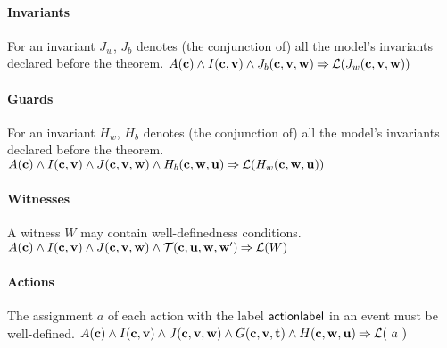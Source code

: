 \paragraph{Invariants}
\label{well_definedness_of_invariants}
For an invariant $J_w$, $J_b$ denotes (the conjunction of) all the model's 
  invariants declared before the theorem.
%
  {$A(\mathbf{c}) \land I(\mathbf{c},\mathbf{v}) \land J_b(\mathbf{c},\mathbf{v},\mathbf{w})
    \mathbin\Rightarrow \mathcal{L}(J_w(\mathbf{c},\mathbf{v},\mathbf{w}))$}

\paragraph{Guards}
\label{well_definedness_of_guards}
For an invariant $H_w$, $H_b$ denotes (the conjunction of) all the model's 
  invariants declared before the theorem.
%
  {$A(\mathbf{c}) \land I(\mathbf{c},\mathbf{v}) \land J(\mathbf{c},\mathbf{v},\mathbf{w}) \land
    H_b(\mathbf{c},\mathbf{w},\mathbf{u}) 
    \mathbin\Rightarrow \mathcal{L}(H_w(\mathbf{c},\mathbf{w},\mathbf{u}))$}

\paragraph{Witnesses}
\label{well_definedness_of_witnesses}
A witness $W$ may contain well-definedness conditions.
%
  {$A(\mathbf{c}) \land I(\mathbf{c},\mathbf{v}) \land J(\mathbf{c},\mathbf{v},\mathbf{w}) \land
    \mathcal{T}(\mathbf{c},\mathbf{u},\mathbf{w},\mathbf{w}')
    \mathbin\Rightarrow \mathcal{L}(W)$}

\paragraph{Actions}
\label{well_definedness_of_actions}
The assignment $a$ of each action with the label $\textsf{actionlabel}$ in
 an event must be well-defined.
%
  {}%
  {$A(\mathbf{c}) \land I(\mathbf{c},\mathbf{v}) \land J(\mathbf{c},\mathbf{v},\mathbf{w}) \land
    G(\mathbf{c},\mathbf{v},\mathbf{t}) \land H(\mathbf{c},\mathbf{w},\mathbf{u}) \mathbin\Rightarrow \mathcal{L}(~a~)$}

